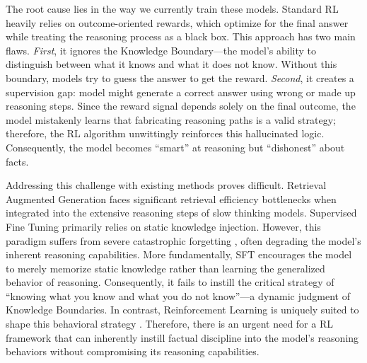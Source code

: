 The root cause lies in the way we currently train these models.
Standard RL heavily relies on outcome-oriented rewards, which optimize for the final answer while treating the reasoning process as a black box. 
This approach has two main flaws.
\textit{First}, it ignores the Knowledge Boundary---the model's ability to distinguish between what it knows and what it does not know. 
Without this boundary, models try to guess the answer to get the reward. 
\textit{Second}, it creates a supervision gap: model might generate a correct answer using wrong or made up reasoning steps. 
Since the reward signal depends solely on the final outcome, the model mistakenly learns that fabricating reasoning paths is a valid strategy; therefore, the RL algorithm unwittingly reinforces this hallucinated logic.
Consequently, the model becomes ``smart'' at reasoning but ``dishonest'' about facts.

Addressing this challenge with existing methods proves difficult. 
Retrieval Augmented Generation \citep[RAG;][]{lewis2020retrieval} faces significant retrieval efficiency bottlenecks when integrated into the extensive reasoning steps of slow thinking models. 
Supervised Fine Tuning \citep[SFT;][]{ouyang2022training} primarily relies on static knowledge injection. 
However, this paradigm suffers from severe catastrophic forgetting \citep{chen2025retaining}, often degrading the model's inherent reasoning capabilities. 
More fundamentally, SFT encourages the model to merely memorize static knowledge rather than learning the generalized behavior of reasoning.
Consequently, it fails to instill the critical strategy of ``knowing what you know and what you do not know''---a dynamic judgment of Knowledge Boundaries. 
In contrast, Reinforcement Learning is uniquely suited to shape this behavioral strategy \citep{gandhi2025cognitive}.
Therefore, there is an urgent need for a RL framework that can inherently instill factual discipline into the model's reasoning behaviors without compromising its reasoning capabilities.




